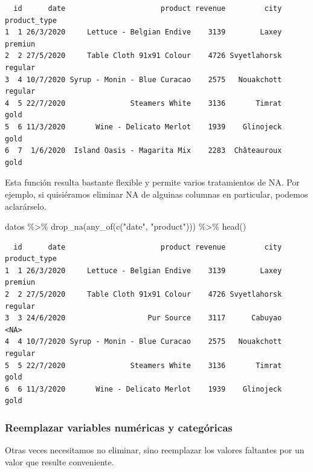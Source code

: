 \documentclass[
  letterpaper,
  DIV=11,
  numbers=noendperiod]{scrreprt}
\newenvironment{Shaded}{\begin{snugshade}}{\end{snugshade}}
\newcommand{\FunctionTok}[1]{\textcolor[rgb]{0.28,0.35,0.67}{#1}}
\newcommand{\NormalTok}[1]{\textcolor[rgb]{0.00,0.23,0.31}{#1}}
\newcommand{\SpecialCharTok}[1]{\textcolor[rgb]{0.37,0.37,0.37}{#1}}
\newcommand{\StringTok}[1]{\textcolor[rgb]{0.13,0.47,0.30}{#1}}
\begin{document}
\begin{verbatim}
  id      date                      product revenue         city product_type
1  1 26/3/2020     Lettuce - Belgian Endive    3139        Laxey      premiun
2  2 27/5/2020     Table Cloth 91x91 Colour    4726 Svyetlahorsk      regular
3  4 10/7/2020 Syrup - Monin - Blue Curacao    2575   Nouakchott      regular
4  5 22/7/2020               Steamers White    3136       Timrat         gold
5  6 11/3/2020       Wine - Delicato Merlot    1939    Glinojeck         gold
6  7  1/6/2020  Island Oasis - Magarita Mix    2283  Châteauroux         gold
\end{verbatim}

Esta función resulta bastante flexible y permite varios tratamientos de
NA. Por ejemplo, si quisiéramos eliminar NA de alguinas columnas en
particular, podemos aclarárselo.

\begin{Shaded}
\begin{Highlighting}[]
\NormalTok{datos }\SpecialCharTok{\%\textgreater{}\%} \FunctionTok{drop\_na}\NormalTok{(}\FunctionTok{any\_of}\NormalTok{(}\FunctionTok{c}\NormalTok{(}\StringTok{"date"}\NormalTok{, }\StringTok{"product"}\NormalTok{))) }\SpecialCharTok{\%\textgreater{}\%} \FunctionTok{head}\NormalTok{()}
\end{Highlighting}
\end{Shaded}

\begin{verbatim}
  id      date                      product revenue         city product_type
1  1 26/3/2020     Lettuce - Belgian Endive    3139        Laxey      premiun
2  2 27/5/2020     Table Cloth 91x91 Colour    4726 Svyetlahorsk      regular
3  3 24/6/2020                   Pur Source    3117      Cabuyao         <NA>
4  4 10/7/2020 Syrup - Monin - Blue Curacao    2575   Nouakchott      regular
5  5 22/7/2020               Steamers White    3136       Timrat         gold
6  6 11/3/2020       Wine - Delicato Merlot    1939    Glinojeck         gold
\end{verbatim}

\hypertarget{reemplazar-variables-numuxe9ricas-y-categuxf3ricas}{%
\subsubsection{Reemplazar variables numéricas y
categóricas}\label{reemplazar-variables-numuxe9ricas-y-categuxf3ricas}}

Otras veces necesitamos no eliminar, sino reemplazar los valores
faltantes por un valor que resulte conveniente.
\end{document}
